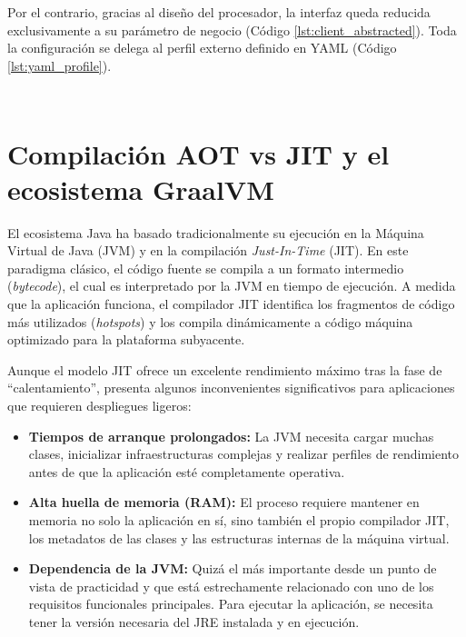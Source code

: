 Por el contrario, gracias al diseño del procesador, la interfaz queda reducida exclusivamente a su parámetro de negocio (Código \ref{lst:client_abstracted}). Toda la configuración se delega al perfil externo definido en YAML (Código \ref{lst:yaml_profile}).

\begin{listing}[htbp]
    \centering
    \inputminted[frame=lines, fontsize=\small]{kotlin}{src/client-processor-2.kt}
    \caption{Interfaz de cliente limpio utilizando \texttt{ClientProcessor}.}
    \label{lst:client_abstracted}
\end{listing}

\begin{listing}[htbp]
    \centering
    \inputminted[frame=lines, fontsize=\small]{yaml}{src/client-processor-2.yaml}
    \caption{Perfil YAML que centraliza la configuración de red y dependencias.}
    \label{lst:yaml_profile}
\end{listing}

\section{Compilación AOT vs JIT y el ecosistema GraalVM}

El ecosistema Java ha basado tradicionalmente su ejecución en la Máquina Virtual de Java (JVM) y en la compilación \textit{Just-In-Time} (JIT). En este paradigma clásico, el código fuente se compila a un formato intermedio (\textit{bytecode}), el cual es interpretado por la JVM en tiempo de ejecución. A medida que la aplicación funciona, el compilador JIT identifica los fragmentos de código más utilizados (\textit{hotspots}) y los compila dinámicamente a código máquina optimizado para la plataforma subyacente.

Aunque el modelo JIT ofrece un excelente rendimiento máximo tras la fase de ``calentamiento'', presenta algunos inconvenientes significativos para aplicaciones que requieren despliegues ligeros: 
\begin{itemize}
    \item \textbf{Tiempos de arranque prolongados:} La JVM necesita cargar muchas clases, inicializar infraestructuras complejas y realizar perfiles de rendimiento antes de que la aplicación esté completamente operativa.
    
    \item \textbf{Alta huella de memoria (RAM):} El proceso requiere mantener en memoria no solo la aplicación en sí, sino también el propio compilador JIT, los metadatos de las clases y las estructuras internas de la máquina virtual.

    \item \textbf{Dependencia de la JVM:} Quizá el más importante desde un punto de vista de practicidad y que está estrechamente relacionado con uno de los requisitos funcionales principales. Para ejecutar la aplicación, se necesita tener la versión necesaria del JRE instalada y en ejecución.
\end{itemize}

